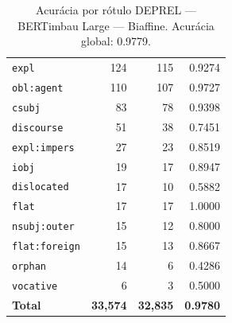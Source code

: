 \begin{table}[ht]
\begin{tabular}{lrrr}
\texttt{expl} & 124 & 115 & 0.9274 \\
\texttt{obl\!:\!agent} & 110 & 107 & 0.9727 \\
\texttt{csubj} & 83 & 78 & 0.9398 \\
\texttt{discourse} & 51 & 38 & 0.7451 \\
\texttt{expl\!:\!impers} & 27 & 23 & 0.8519 \\
\texttt{iobj} & 19 & 17 & 0.8947 \\
\texttt{dislocated} & 17 & 10 & 0.5882 \\
\texttt{flat} & 17 & 17 & 1.0000 \\
\texttt{nsubj\!:\!outer} & 15 & 12 & 0.8000 \\
\texttt{flat\!:\!foreign} & 15 & 13 & 0.8667 \\
\texttt{orphan} & 14 & 6 & 0.4286 \\
\texttt{vocative} & 6 & 3 & 0.5000 \\
\midrule
\textbf{Total} & \textbf{33,574} & \textbf{32,835} & \textbf{0.9780} \\
\bottomrule
\end{tabular}
\caption{Acurácia por rótulo DEPREL — BERTimbau Large — Biaffine. Acurácia global: 0.9779.}
\label{tab:deprel-acc-predict-test-df-bertimbau-large-biaffine}
\end{table}


